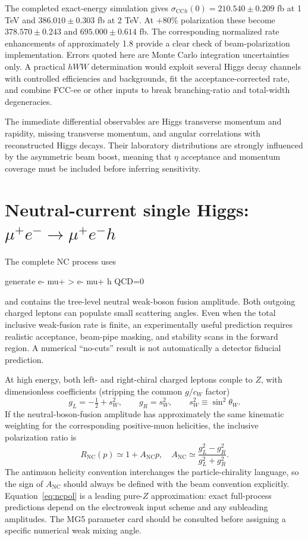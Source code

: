\documentclass[12pt,a4paper]{article}
\newcommand{\newnote}{\clearpage}
\newcommand{\CC}{\mathrm{CC}}
\newcommand{\NC}{\mathrm{NC}}
\begin{document}
The completed exact-energy simulation gives $\sigma_{\CC h}(0)=210.540\pm0.209$ fb at 1 TeV and $386.010\pm0.303$ fb at 2 TeV. At +80\% polarization these become $378.570\pm0.243$ and $695.000\pm0.614$ fb. The corresponding normalized rate enhancements of approximately 1.8 provide a clear check of beam-polarization implementation. Errors quoted here are Monte Carlo integration uncertainties only. A practical $hWW$ determination would exploit several Higgs decay channels with controlled efficiencies and backgrounds, fit the acceptance-corrected rate, and combine FCC-ee or other inputs to break branching-ratio and total-width degeneracies.

The immediate differential observables are Higgs transverse momentum and rapidity, missing transverse momentum, and angular correlations with reconstructed Higgs decays. Their laboratory distributions are strongly influenced by the asymmetric beam boost, meaning that $\eta$ acceptance and momentum coverage must be included before inferring sensitivity.




\newnote

\section{Neutral-current single Higgs: $\mu^+e^-\to\mu^+e^-h$}
The complete NC process uses
\begin{center}\ttfamily\small generate e- mu+ > e- mu+ h QCD=0\end{center}
and contains the tree-level neutral weak-boson fusion amplitude. Both outgoing charged leptons can populate small scattering angles. Even when the total inclusive weak-fusion rate is finite, an experimentally useful prediction requires realistic acceptance, beam-pipe masking, and stability scans in the forward region. A numerical ``no-cuts'' result is not automatically a detector fiducial prediction.

At high energy, both left- and right-chiral charged leptons couple to $Z$, with dimensionless coefficients (stripping the common $g/c_W$ factor)
\begin{equation}
 g_L=-\tfrac12+s_W^2,\qquad g_R=s_W^2,
 \qquad s_W^2\equiv\sin^2\theta_W.
\end{equation}
If the neutral-boson-fusion amplitude has approximately the same kinematic weighting for the corresponding positive-muon helicities, the inclusive polarization ratio is
\begin{equation}\label{eq:ncpol}
R_{\NC}(p)\simeq1+A_{\NC}p,\quad
A_{\NC}\simeq\frac{g_L^2-g_R^2}{g_L^2+g_R^2}.
\end{equation}
The antimuon helicity convention interchanges the particle-chirality language, so the sign of $A_{\NC}$ should always be defined with the beam convention explicitly. Equation~\eqref{eq:ncpol} is a leading pure-$Z$ approximation: exact full-process predictions depend on the electroweak input scheme and any subleading amplitudes. The MG5 parameter card should be consulted before assigning a specific numerical weak mixing angle.
\end{document}

